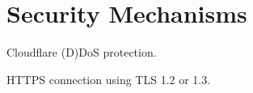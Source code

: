\section{Security Mechanisms}
\label{sec:security_mechanisms}
Cloudflare (D)DoS protection.

HTTPS connection using TLS 1.2 or 1.3.